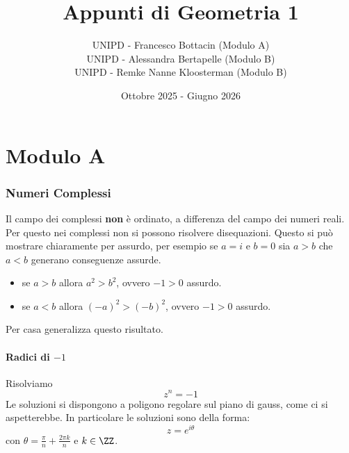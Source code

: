 \documentclass[11pt]{scrartcl}
\begin{document}
	
	\title{Appunti di Geometria 1}
	\subtitle{
		UNIPD - Francesco Bottacin (Modulo A) \\
		UNIPD - Alessandra Bertapelle (Modulo B) \\
		UNIPD - Remke Nanne Kloosterman (Modulo B)
	}
	\date{Ottobre 2025 - Giugno 2026}
	
	\maketitle
	
	\tableofcontents
	
	\newpage
	
	
	\part{Modulo A}
	
	\section{Numeri Complessi}
	
	Il campo dei complessi \textbf{non} è ordinato, a differenza del campo dei numeri reali. Per questo nei complessi non si possono risolvere disequazioni. Questo si può mostrare chiaramente per assurdo, per esempio se $a=i$ e $b=0$ sia $a>b$ che $a<b$ generano conseguenze assurde.
	\begin{itemize}
		\item se $a>b$ allora $a^2>b^2$, ovvero $-1>0$ assurdo.
		\item se $a<b$ allora $(-a)^2>(-b)^2$, ovvero $-1>0$ assurdo.
	\end{itemize}
	Per casa generalizza questo risultato.
	
	\subsection{Radici di $-1$}
	Risolviamo
	$$z^n=-1$$
	Le soluzioni si dispongono a poligono regolare sul piano di gauss, come ci si aspetterebbe. In particolare le soluzioni sono della forma:
	$$z=e^{i\theta}$$
	con $\theta=\frac{\pi}{n}+\frac{2\pi k}{n}$ e $k\in\ZZ$.
	
\end{document}
